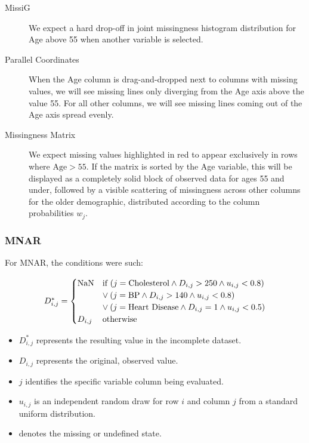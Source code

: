 \documentclass[a4paper, 11pt]{article}
\begin{document}
\begin{description}
        \item [MissiG] We expect a hard drop-off in joint missingness histogram
                distribution for Age above 55 when another variable is
                selected. 

        \item [Parallel Coordinates] When the Age column is drag-and-dropped
                next to columns with missing values, we will see missing lines
                only diverging from the Age axis above the value 55. For all
                other columns, we will see missing lines coming out of the Age
                axis spread evenly.

        \item [Missingness Matrix] We expect missing values highlighted in red
                to appear exclusively in rows where $\text{Age} > 55$. If the
                matrix is sorted by the Age variable, this will be displayed as
                a completely solid block of observed data for ages 55 and
                under, followed by a visible scattering of missingness across
                other columns for the older demographic, distributed according
                to the column probabilities $w_j$.
\end{description}

\subsubsection*{MNAR}

For MNAR, the conditions were such:

\begin{equation} 
$$
D_{i,j}^* = 
\begin{cases} 
\text{NaN} & \text{if } (j = \text{Cholesterol} \land D_{i,j} > 250 \land u_{i,j} < 0.8) \\
           & \lor \: (j = \text{BP} \land D_{i,j} > 140 \land u_{i,j} < 0.8) \\
           & \lor \: (j = \text{Heart Disease} \land D_{i,j} = 1 \land u_{i,j} < 0.5) \\
D_{i,j} & \text{otherwise} 
\end{cases}
$$
\end{equation} 

\begin{itemize}
    \item $D_{i,j}^*$ represents the resulting value in the incomplete dataset.
    \item $D_{i,j}$ represents the original, observed value.
    \item $j$ identifies the specific variable column being evaluated.
    \item $u_{i,j}$ is an independent random draw for row $i$ and column $j$
            from a standard uniform distribution.
    \item {} denotes the missing or undefined state.
\end{itemize}
\end{document}
